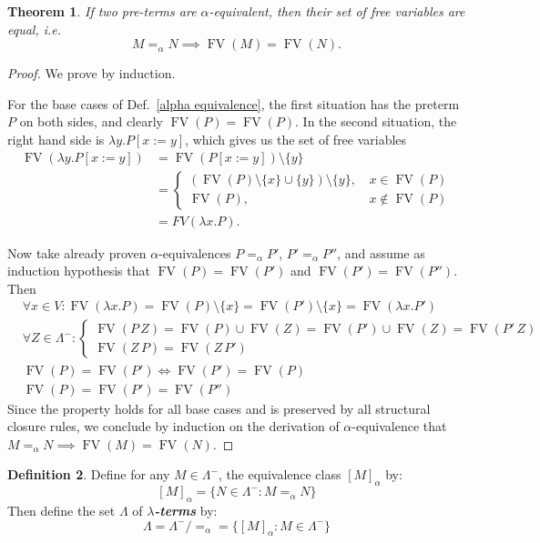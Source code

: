 \documentclass[]{article}
\newtheorem{theorem}{Theorem}
\theoremstyle{definition}
\newtheorem{definition}[theorem]{Definition}
\newcommand{\FV}{\operatorname{FV}}
\newcommand{\preterm}{\Lambda^{-}}
\newcommand{\deftext}[1]{\textit{\textbf{#1}}}
\newcommand{\alphaeq}{=_{\alpha}}
\begin{document}
\begin{theorem}\label{uniqueness of free variables}
	If two pre-terms are $\alpha$-equivalent, then their set of free variables are equal, i.e. $$M \alphaeq N \implies \FV(M) = \FV(N).$$
\end{theorem}
\begin{proof}
	We prove by induction.
	
	For the base cases of Def.~\ref{alpha equivalence}, the first situation has the preterm $P$ on both sides, and clearly $\FV(P) = \FV(P)$. In the second situation, the right hand side is $\lambda y. P[x:=y]$, which gives us the set of free variables 
	\begin{align*}
		\FV(\lambda y. P[x:= y]) &= \FV(P[x:= y])\setminus \{y\} \\
		&= \begin{cases}
			(\FV(P)\setminus \{x\} \cup \{y\})\setminus \{y\},\, &x \in \FV(P) \\
			\FV(P), \, &x \notin \FV(P)
		\end{cases}\\
		&= FV(\lambda x. P).
	\end{align*}
	
	Now take already proven $\alpha$-equivalences  $P \alphaeq P'$, $P' \alphaeq P''$, and assume as induction hypothesis that $\FV(P) = \FV(P')$ and $\FV(P') = \FV(P'')$. Then
	\begin{align*}
		&\forall x \in V: \FV(\lambda x. P) = \FV(P) \setminus \{x\} = \FV(P') \setminus \{x\} = \FV(\lambda x. P') \\
		&\forall Z \in \preterm : \begin{cases}
			\FV(P\, Z) = \FV(P)\cup \FV(Z) = \FV(P') \cup \FV(Z) = \FV(P'\, Z) \\
			\FV(Z\, P) = \FV(Z\, P')
		\end{cases}  \\
		&\FV(P) = \FV(P') \iff \FV(P') = \FV(P) \\
		&\FV(P) = \FV(P') = \FV(P'')
	\end{align*}
	Since the property holds for all base cases and is preserved by all  structural closure rules, we conclude by induction on the derivation of $\alpha$-equivalence that $M \alphaeq N \implies \FV(M) = \FV(N)$.
\end{proof}

\begin{definition}
	Define for any $M \in \preterm$, the equivalence class $[M]_{\alpha}$ by: 
	$$[M]_{\alpha} = \{N \in\preterm : M \alphaeq N\}$$
	Then define the set $\Lambda$ of \deftext{$\lambda$-terms} by:
	$$\Lambda =  \preterm \!/\! =_{\alpha} = \{[M]_{\alpha} : M \in \preterm \}$$
\end{definition}
\end{document}
